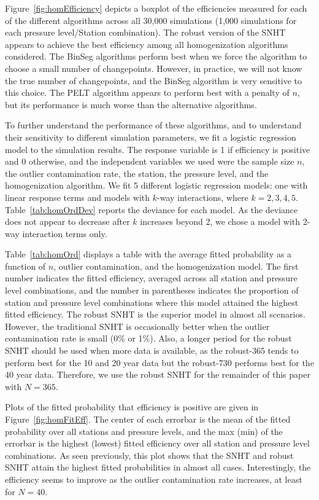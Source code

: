 \documentclass[12pt]{article}
\begin{document}
\begin{doublespacing}
Figure~\ref{fig:homEfficiency} depicts a boxplot of the efficiencies measured for each of the different algorithms across all 30,000 simulations (1,000 simulations for each pressure level/Station combination).  The robust version of the SNHT appears to achieve the best efficiency among all homogenization algorithms considered.  The BinSeg algorithms perform best when we force the algorithm to choose a small number of changepoints.  However, in practice, we will not know the true number of changepoints, and the BinSeg algorithm is very sensitive to this choice.  The PELT algorithm appears to perform best with a penalty of $n$, but its performance is much worse than the alternative algorithms.

To further understand the performance of these algorithms, and to understand their sensitivity to different simulation parameters, we fit a logistic regression model to the simulation results.  The response variable is 1 if efficiency is positive and 0 otherwise, and the independent variables we used were the sample size $n$, the outlier contamination rate, the station, the pressure level, and the homogenization algorithm.  We fit 5 different logistic regression models: one with linear response terms and models with $k$-way interactions, where $k=2,3,4,5$.  Table~\ref{tab:homOrdDev} reports the deviance for each model.  As the deviance does not appear to decrease after $k$ increases beyond 2, we chose a model with 2-way interaction terms only.

Table~\ref{tab:homOrd} displays a table with the average fitted probability as a function of $n$, outlier contamination, and the homogenization model.  The first number indicates the fitted efficiency, averaged across all station and pressure level combinations, and the number in parentheses indicates the proportion of station and pressure level combinations where this model attained the highest fitted efficiency.  The robust SNHT is the superior model in almost all scenarios.  However, the traditional SNHT is occasionally better when the outlier contamination rate is small (0\% or 1\%).  Also, a longer period for the robust SNHT should be used when more data is available, as the robust-365 tends to perform best for the 10 and 20 year data but the robust-730 performs best for the 40 year data.  Therefore, we use the robust SNHT for the remainder of this paper with $N=365$.

Plots of the fitted probability that efficiency is positive are given in Figure~\ref{fig:homFitEff}.  The center of each errorbar is the mean of the fitted probability over all stations and pressure levels, and the max (min) of the errorbar is the highest (lowest) fitted efficiency over all station and pressure level combinations.  As seen previously, this plot shows that the SNHT and robust SNHT attain the highest fitted probabilities in almost all cases.  Interestingly, the efficiency seems to improve as the outlier contamination rate increases, at least for $N=40$.


\end{doublespacing}
\end{document}

